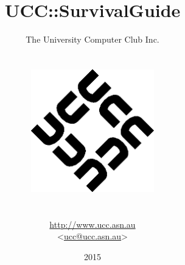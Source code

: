 \begin{titlepage}


\title{UCC::SurvivalGuide}
\author{The University Computer Club Inc. \\ \\ \\
	\includegraphics[width=0.4\textwidth]{figures/ucc-logo.png} \\  \\ \\ %
	\url{http://www.ucc.asn.au} \\ <\href{mailto:ucc@ucc.asn.au}{ucc@ucc.asn.au}> \\
}

\date{2015}



\maketitle
\centering



\end{titlepage}
